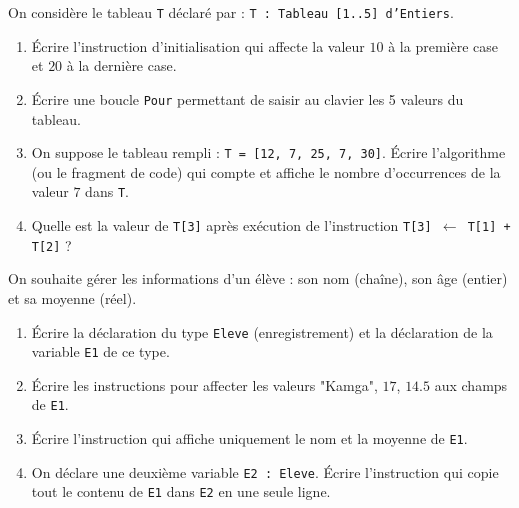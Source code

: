 \documentclass[11pt]{article}
\begin{document}
\begin{exercice}
On considère le tableau \texttt{T} déclaré par : \texttt{T : Tableau [1..5] d'Entiers}.
\begin{enumerate}
    \item Écrire l'instruction d'initialisation qui affecte la valeur $10$ à la première case et $20$ à la dernière case.
    \item Écrire une boucle \texttt{Pour} permettant de saisir au clavier les 5 valeurs du tableau.
    \item On suppose le tableau rempli : \texttt{T = [12, 7, 25, 7, 30]}. Écrire l'algorithme (ou le fragment de code) qui compte et affiche le nombre d'occurrences de la valeur $7$ dans \texttt{T}.
    \item Quelle est la valeur de \texttt{T[3]} après exécution de l'instruction \texttt{T[3] $\leftarrow$ T[1] + T[2]} ?
\end{enumerate}
\end{exercice}

\begin{exercice}
On souhaite gérer les informations d'un élève : son nom (chaîne), son âge (entier) et sa moyenne (réel).
\begin{enumerate}
    \item Écrire la déclaration du type \texttt{Eleve} (enregistrement) et la déclaration de la variable \texttt{E1} de ce type.
    \item Écrire les instructions pour affecter les valeurs "Kamga", $17$, $14.5$ aux champs de \texttt{E1}.
    \item Écrire l'instruction qui affiche uniquement le nom et la moyenne de \texttt{E1}.
    \item On déclare une deuxième variable \texttt{E2 : Eleve}. Écrire l'instruction qui copie tout le contenu de \texttt{E1} dans \texttt{E2} en une seule ligne.
\end{enumerate}
\end{exercice}
\end{document}
